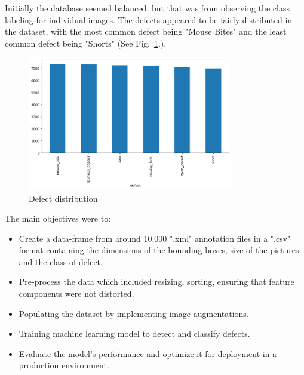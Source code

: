 \documentclass[12pt]{article}
\begin{document}
Initially the database seemed balanced, but that was from observing the class labeling for individual images. The defects appeared to be fairly distributed in the dataset, with the most common defect being "Mouse Bites" and the least common defect being "Shorts" (See Fig.~\ref{fig:defect_dist}.).

\begin{figure}[h]
    \centering
    \includegraphics[width=0.8\textwidth]{./graphics/1.png}
    \caption{Defect distribution}
    \label{fig:defect_dist}
\end{figure}
The main objectives were to:
\begin{itemize}
    \item Create a data-frame from around 10.000 ".xml" annotation files in a ".csv" format containing the dimensions of the bounding boxes, size of the pictures and the class of defect.
    \item Pre-process the data which included resizing, sorting, ensuring that feature components were not distorted. 
    \item Populating the dataset by implementing image augmentations.
    \item Training machine learning model to detect and classify defects.
    \item Evaluate the model's performance and optimize it for deployment in a production environment.
\end{itemize}
\end{document}
